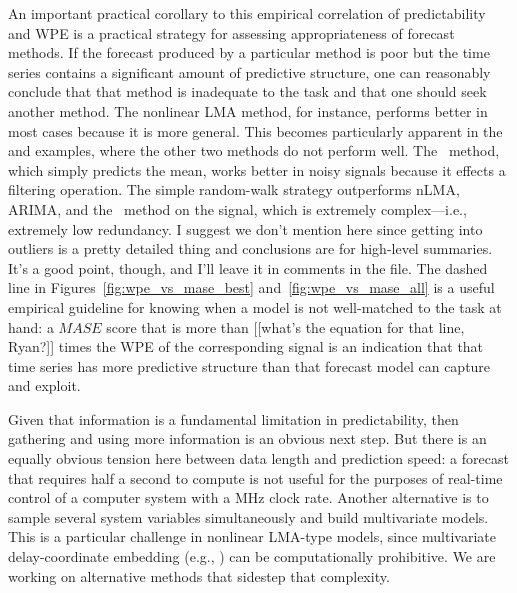 An important practical corollary to this empirical correlation of
predictability and WPE is a practical strategy for assessing
appropriateness of forecast methods.  If the forecast produced by a
particular method is poor but the time series contains a significant
amount of predictive structure, one can reasonably conclude that that
method is inadequate to the task and that one should seek another
method.  The nonlinear LMA method, for instance, performs better in
most cases because it is more general.  This becomes particularly
apparent in the \col and \svdfive examples, where the other two
methods do not perform well.  The \naive ~method, which simply
predicts the mean, works better in noisy signals because it effects a
filtering operation.  The simple random-walk strategy outperforms
nLMA, ARIMA, and the \naive ~method on the \gcc signal, which is
extremely complex---i.e., extremely low redundancy.  {\color{red} I
  suggest we don't mention \svdone here since getting into outliers is
  a pretty detailed thing and conclusions are for high-level
  summaries.  It's a good point, though, and I'll leave it in comments
  in the file.}
The dashed line in Figures~\ref{fig:wpe_vs_mase_best}
and~\ref{fig:wpe_vs_mase_all} is a useful empirical guideline for
knowing when a model is not well-matched to the task at hand: a $MASE$
score that is more than {\color{red}[[what's the equation for that
      line, Ryan?]]} times the WPE of the corresponding signal is an
indication that that time series has more predictive structure than
that forecast model can capture and exploit.

Given that information is a fundamental limitation in predictability,
then gathering and using more information is an obvious next step.
But there is an equally obvious tension here between data length and
prediction speed: a forecast that requires half a second to compute is
not useful for the purposes of real-time control of a computer system
with a MHz clock rate.  Another alternative is to sample several
system variables simultaneously and build multivariate models.  This
is a particular challenge in nonlinear LMA-type models, since
multivariate delay-coordinate embedding (e.g.,
\cite{cao-multivariate-embedding,deyle-sugihara2011}) can be
computationally prohibitive.  We are working on alternative methods
that sidestep that complexity.



